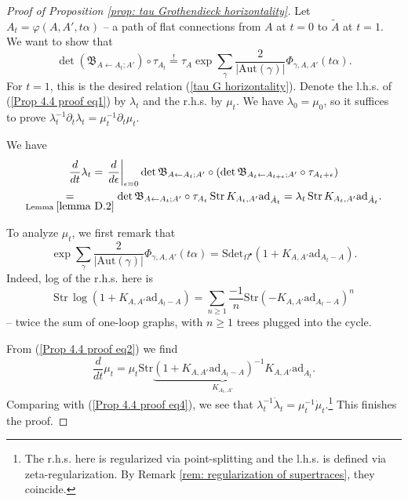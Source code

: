\documentclass[11pt,a4paper]{amsart}
\theoremstyle{plain} %
\theoremstyle{definition}
\theoremstyle{remark}
\newcommand{\mr}{\mathrm}
\newcommand{\bt}{\bullet}
\newcommand{\til}{\widetilde}
\newcommand{\ad}{\mathrm{ad}}
\newcommand{\la}{\leftarrow}
\newcommand{\BB}{\mathfrak{B}}
\begin{document}
\begin{proof}[Proof of Proposition \ref{prop: tau Grothendieck horizontality}]
 Let $A_t=\varphi(A,A',t\alpha)$  -- a path of flat connections from $A$ at $t=0$ to $\til{A}$ at $t=1$. We want to show that
 \begin{equation}\label{Prop 4.4 proof eq1}
     \det(\BB_{A\la A_t;A'})\circ \tau_{A_t} \stackrel{!}{=} \tau_A \exp\sum_\gamma \frac{2}{|\mr{Aut}(\gamma)|}\Phi_{\gamma,A,A'}(t\alpha).
 \end{equation}
For $t=1$, this is the desired relation (\ref{tau G horizontality}). Denote the l.h.s. of (\ref{Prop 4.4 proof eq1}) by $\lambda_t$ and the r.h.s. by $\mu_t$. We have $\lambda_0=\mu_0$, so it suffices to prove $\lambda_t^{-1}\partial_t \lambda_t=\mu_t^{-1}\partial_t\mu_t$.

We have
\begin{multline}\label{Prop 4.4 proof eq4}
    \frac{d}{dt}\lambda_t=\left.\frac{d}{d\epsilon}\right|_{\epsilon=0} \det\BB_{A\la A_t;A'}\circ(\det\BB_{A_t\la A_{t+\epsilon};A'}\circ \tau_{A_t+\epsilon})\\
    \underset{\mr{Lemma}\; \ref{lemma D.2}}{=}
    \det\BB_{A\la A_t;A'}\circ\tau_{A_t}\,\mr{Str}\, K_{A_t,A'}\ad_{\dot{A}_t}=
    \lambda_t \,\mr{Str}\, K_{A_t,A'}\ad_{\dot{A}_t}.
\end{multline}

To analyze $\mu_t$, we first remark that 
\begin{equation}\label{Prop 4.4 proof eq2}
\exp\sum_\gamma \frac{2}{|\mr{Aut}(\gamma)|}\Phi_{\gamma,A,A'}(t\alpha)= \mr{Sdet}_{\Omega^\bt}(1+K_{A,A'}\ad_{A_t-A}). 
\end{equation}
Indeed, log of the r.h.s. here is 
$$ \mr{Str}\,\log (1+K_{A,A'}\ad_{A_t-A})=\sum_{n\geq 1}\frac{-1}{n}\mr{Str}(-K_{A,A'}\ad_{A_t-A})^n $$
-- twice the sum of  one-loop graphs, with $n\geq 1$ trees plugged into the cycle.

From (\ref{Prop 4.4 proof eq2}) we find
\begin{equation}\label{Prop 4.4 proof eq3}
    \frac{d}{dt} \mu_t=\mu_t \mr{Str} \underbrace{(1+K_{A,A'}\ad_{A_t-A})^{-1}K_{A,A'}}_{K_{A_t,A'}}\ad_{\dot{A}_t}.
\end{equation}
Comparing with (\ref{Prop 4.4 proof eq4}), we see that $\lambda_t^{-1}\dot\lambda_t=\mu_t^{-1}\dot\mu_t$.\footnote{The r.h.s. here is regularized via point-splitting and the l.h.s. is defined via zeta-regularization. By Remark \ref{rem: regularization of supertraces}, they coincide.
} This finishes the proof.
\end{proof}
\end{document}
